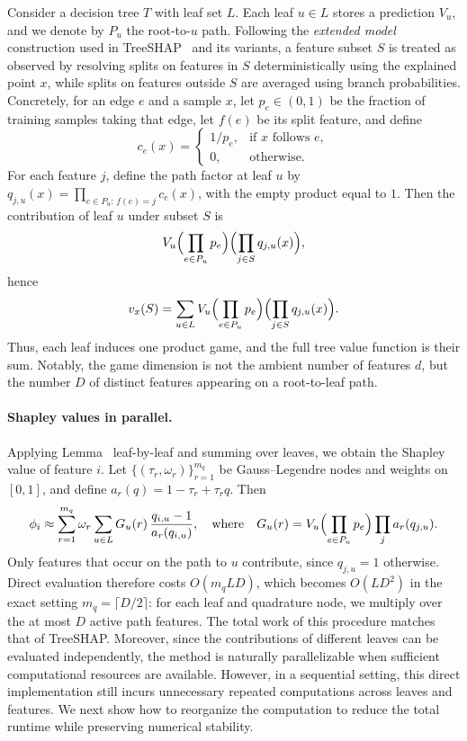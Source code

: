 \documentclass{article}
\begin{document}
Consider a decision tree $T$ with leaf set $L$. Each leaf $u \in L$ stores a prediction $V_u$, and we denote by $P_u$ the root-to-$u$ path. Following the \textit{extended model} construction used in TreeSHAP~\citet{treeshap} and its variants, a feature subset $S$ is treated as observed by resolving splits on features in $S$ deterministically using the explained point $x$, while splits on features outside $S$ are averaged using branch probabilities. Concretely, for an edge $e$ and a sample $x$, let $p_e \in (0,1)$ be the fraction of training samples taking that edge, let $f(e)$ be its split feature, and define
\[
c_e(x)=
\begin{cases}
1/p_e, & \text{if } x \text{ follows } e,\\
0, & \text{otherwise.}
\end{cases}
\]
For each feature $j$, define the path factor at leaf $u$ by $q_{j,u}(x)=\prod_{e\in P_u:\, f(e)=j} c_e(x)$,
with the empty product equal to $1$. Then the contribution of leaf $u$ under subset $S$ is
\[
V_u \Bigl(\prod_{e\in P_u} p_e\Bigr)\Bigl(\prod_{j\in S} q_{j,u}(x)\Bigr),
\]
hence
\[
v_x(S)=\sum_{u\in L} V_u \Bigl(\prod_{e\in P_u} p_e\Bigr)\Bigl(\prod_{j\in S} q_{j,u}(x)\Bigr).
\]
Thus, each leaf induces one product game, and the full tree value function is their sum. Notably, the game dimension is not the ambient number of features $d$, but the number $D$ of distinct features appearing on a root-to-leaf path.

\paragraph{Shapley values in parallel.}

Applying Lemma~ leaf-by-leaf and summing over leaves, we obtain the Shapley value of feature $i$. Let $\{(\tau_r,\omega_r)\}_{r=1}^{m_q}$ be Gauss--Legendre nodes and weights on $[0,1]$, and define $a_r(q)=1-\tau_r+\tau_r q$.
Then
\begin{equation}
\phi_i \approx \sum_{r=1}^{m_q}\omega_r \sum_{u\in L} G_u(r)\,\frac{q_{i,u}-1}{a_r(q_{i,u})},
\quad \text{where}\quad 
G_u(r)=V_u\Bigl(\prod_{e\in P_u} p_e\Bigr)\prod_j a_r(q_{j,u}).
\end{equation}
Only features that occur on the path to $u$ contribute, since $q_{j,u}=1$ otherwise. Direct evaluation therefore costs $O(m_qLD)$, which becomes $O(LD^2)$ in the exact setting $m_q=\lceil D/2\rceil$: for each leaf and quadrature node, we multiply over the at most $D$ active path features. The total work of this procedure matches that of TreeSHAP. Moreover, since the contributions of different leaves can be evaluated independently, the method is naturally parallelizable when sufficient computational resources are available. However, in a sequential setting, this direct implementation still incurs unnecessary repeated computations across leaves and features. We next show how to reorganize the computation to reduce the total runtime while preserving numerical stability.
\end{document}
